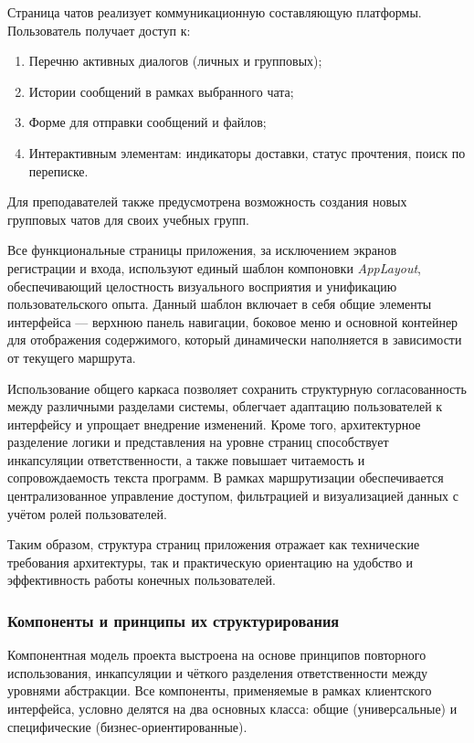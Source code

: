 Страница чатов реализует коммуникационную составляющую платформы. Пользователь получает доступ к:
\begin{enumerate}
\item Перечню активных диалогов (личных и групповых);
\item Истории сообщений в рамках выбранного чата;
\item Форме для отправки сообщений и файлов;
\item Интерактивным элементам: индикаторы доставки, статус прочтения, поиск по переписке.
\end{enumerate}
Для преподавателей также предусмотрена возможность создания новых групповых чатов для своих учебных групп.

Все функциональные страницы приложения, за исключением экранов регистрации и входа, используют единый шаблон компоновки \textit{AppLayout}, обеспечивающий целостность визуального восприятия и унификацию пользовательского опыта. Данный шаблон включает в себя общие элементы интерфейса — верхнюю панель навигации, боковое меню и основной контейнер для отображения содержимого, который динамически наполняется в зависимости от текущего маршрута.

Использование общего каркаса позволяет сохранить структурную согласованность между различными разделами системы, облегчает адаптацию пользователей к интерфейсу и упрощает внедрение изменений. Кроме того, архитектурное разделение логики и представления на уровне страниц способствует инкапсуляции ответственности, а также повышает читаемость и сопровождаемость текста программ. В рамках маршрутизации обеспечивается централизованное управление доступом, фильтрацией и визуализацией данных с учётом ролей пользователей.

Таким образом, структура страниц приложения отражает как технические требования архитектуры, так и практическую ориентацию на удобство и эффективность работы конечных пользователей.

\subsubsection{Компоненты и принципы их структурирования}

Компонентная модель проекта выстроена на основе принципов повторного использования, инкапсуляции и чёткого разделения ответственности между уровнями абстракции. Все компоненты, применяемые в рамках клиентского интерфейса, условно делятся на два основных класса: общие (универсальные) и специфические (бизнес-ориентированные).

